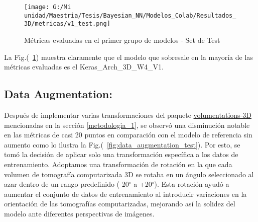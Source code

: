 \documentclass[10pt, oneside, a4paper]{article}
\begin{document}


	\begin{figure}[H]
		\centering
		\texttt{[image: G:/Mi unidad/Maestria/Tesis/Bayesian\_NN/Modelos\_Colab/Resultados\_3D/metricas/v1\_test.png]}
		\caption{Métricas evaluadas en el primer grupo de modelos - Set de Test}
		\label{fig:grupo1_test}
	\end{figure}

	La Fig.(~\ref{fig:grupo1_test}) muestra claramente que el modelo que sobresale en la mayoría de las métricas evaluadas es el Keras\_Arch\_3D\_W4\_V1.

	\subsection{Data Augmentation:} \label{r_data_augmentation}	
	
	
	Después de implementar varias transformaciones del paquete \href{https://github.com/ZFTurbo/volumentations}{volumentations-3D} mencionadas en la sección \ref{metodologia_1}, se observó una disminución notable en las métricas de casi 20 puntos en comparación con el modelo de referencia sin aumento como lo ilustra la Fig.(~\ref{fig:data_augmentation_test}). Por esto, se tomó la decisión de aplicar solo una transformación específica a los datos de entrenamiento. Adoptamos una transformación de rotación en la que cada volumen de tomografía computarizada 3D se rotaba en un ángulo seleccionado al azar dentro de un rango predefinido (-20$^{\circ}$ a +20$^{\circ}$). Esta rotación ayudó a aumentar el conjunto de datos de entrenamiento al introducir variaciones en la orientación de las tomografías computarizadas, mejorando así la solidez del modelo ante diferentes perspectivas de imágenes.
	
\end{document}
